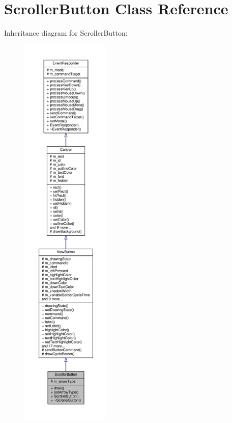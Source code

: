 \hypertarget{classScrollerButton}{}\section{Scroller\+Button Class Reference}
\label{classScrollerButton}


Inheritance diagram for Scroller\+Button\+:
\nopagebreak
\begin{figure}[H]
\begin{center}
\leavevmode
\includegraphics[height=550pt]{d6/d7d/classScrollerButton__inherit__graph}
\end{center}
\end{figure}


